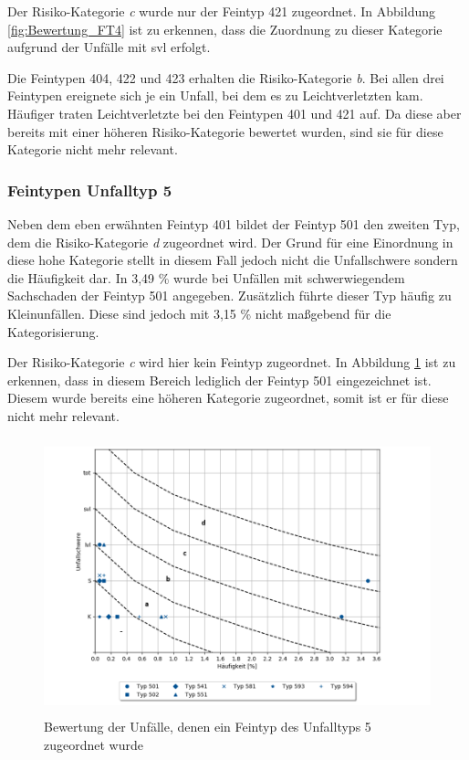 Der Risiko-Kategorie \textit{c} wurde nur der Feintyp 421 zugeordnet. In Abbildung \ref{fig:Bewertung_FT4} ist zu erkennen, dass die Zuordnung zu dieser Kategorie aufgrund der Unfälle mit \ac{svl} erfolgt.

Die Feintypen 404, 422 und 423 erhalten die Risiko-Kategorie \textit{b}. Bei allen drei Feintypen ereignete sich je ein Unfall, bei dem es zu Leichtverletzten kam. Häufiger traten Leichtverletzte bei den Feintypen 401 und 421 auf. Da diese aber bereits mit einer höheren Risiko-Kategorie bewertet wurden, sind sie für diese Kategorie nicht mehr relevant.

\subsubsection{Feintypen Unfalltyp 5}
Neben dem eben erwähnten Feintyp 401 bildet der Feintyp 501 den zweiten Typ, dem die Risiko-Kategorie \textit{d} zugeordnet wird. Der Grund für eine Einordnung in diese hohe Kategorie stellt in diesem Fall jedoch nicht die Unfallschwere sondern die Häufigkeit dar. In 3,49 \% wurde bei Unfällen mit schwerwiegendem Sachschaden der Feintyp 501 angegeben. Zusätzlich führte dieser Typ häufig zu Kleinunfällen. Diese sind jedoch mit 3,15 \% nicht maßgebend für die Kategorisierung.

Der Risiko-Kategorie \textit{c} wird hier kein Feintyp zugeordnet. In Abbildung \ref{fig:Bewertung_FT5} ist zu erkennen, dass in diesem Bereich lediglich der Feintyp 501 eingezeichnet ist. Diesem wurde bereits eine höheren Kategorie zugeordnet, somit ist er für diese nicht mehr relevant.

\begin{savenotes}
	\begin{figure}[H]
		\centering
		\includegraphics[width=12cm,height=8cm]{figures/Bewertung_FT5}
		\caption[Bewertung der Unfälle, denen ein Feintyp des Unfalltyps 5 zugeordnet wurde]{Bewertung der Unfälle, denen ein Feintyp des Unfalltyps 5 zugeordnet wurde}\label{fig:Bewertung_FT5}
	\end{figure}
\end{savenotes}

